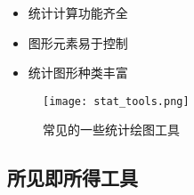 \begin{frame}[t]{\subsecname}
  \begin{itemize}
    \item 统计计算功能齐全
    \item 图形元素易于控制
    \item 统计图形种类丰富
  \end{itemize}

\begin{figure}[ht]
  \centering \texttt{[image: stat\_tools.png]}
  \caption{常见的一些统计绘图工具}
\end{figure}
\end{frame}

\subsection{所见即所得工具}

